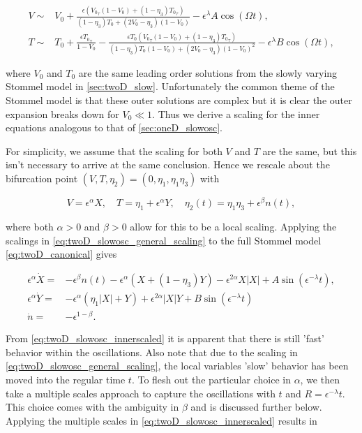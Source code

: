 \begin{equation}\label{eq:twoD_slowosc_outersoln}
\begin{aligned}
V\sim& V_0 + \frac{\epsilon({V_0}_\tau(1-V_0)+(1-\eta_3){T_0}_\tau)}{(1-\eta_3)T_0+(2V_0-\eta_3)(1-V_0)}-\epsilon^\lambda A \cos(\Omega t),\\
T\sim& T_0 + \frac{\epsilon {T_0}_\tau}{1-V_0}-\frac{\epsilon T_0({V_0}_\tau(1-V_0)+(1-\eta_3){T_0}_\tau)}{(1-\eta_3)T_0(1-V_0)+(2V_0-\eta_3)(1-V_0)^2}-\epsilon^\lambda B \cos(\Omega t),
\end{aligned}
\end{equation}

where $V_0$ and $T_0$ are the same leading order solutions from the slowly varying Stommel model in \autoref{sec:twoD_slow}. Unfortunately the common theme of the Stommel model is that these outer solutions are complex but it is clear the outer expansion breaks down for $V_0\ll 1$. Thus we derive a scaling for the inner equations analogous to that of \autoref{sec:oneD_slowosc}.

For simplicity, we assume that the scaling for both $V$ and $T$ are the same, but this isn't necessary to arrive at the same conclusion. Hence we rescale about the bifurcation point $(V,T,\eta_2)=(0,\eta_1,\eta_1\eta_3)$ with

\begin{equation}\label{eq:twoD_slowosc_general_scaling}
V=\epsilon^\alpha X, \quad T=\eta_1+\epsilon^\alpha Y ,\quad \eta_2(t)=\eta_1\eta_3+\epsilon^\beta n(t),
\end{equation}

where both $\alpha>0$ and $\beta>0$ allow for this to be a local scaling. Applying the scalings in \eqref{eq:twoD_slowosc_general_scaling} to the full Stommel model \eqref{eq:twoD_canonical} gives

\begin{equation}\label{eq:twoD_slowosc_innerscaled}
\begin{aligned}
\epsilon^\alpha \dot{X}=& -\epsilon^\beta n(t)-\epsilon^\alpha (X+(1-\eta_3)Y) - \epsilon^{2\alpha}X|X| +A\sin(\epsilon^{-\lambda}t),\\
\epsilon^\alpha \dot{Y}=&-\epsilon^\alpha(\eta_1|X|+Y)+\epsilon^{2\alpha}|X|Y +B\sin(\epsilon^{-\lambda} t)\\
\dot{n}=&-\epsilon^{1-\beta}.
\end{aligned}
\end{equation}

From \eqref{eq:twoD_slowosc_innerscaled} it is apparent that there is still 'fast' behavior within the oscillations. Also note that due to the scaling in \eqref{eq:twoD_slowosc_general_scaling}, the local variables 'slow' behavior has been moved into the regular time $t$. To flesh out the particular choice in $\alpha$, we then take a multiple scales approach to capture the oscillations with $t$ and $R=\epsilon^{-\lambda}t$.  This choice comes with the ambiguity in $\beta$ and is discussed further below. Applying the multiple scales in \eqref{eq:twoD_slowosc_innerscaled} results in

